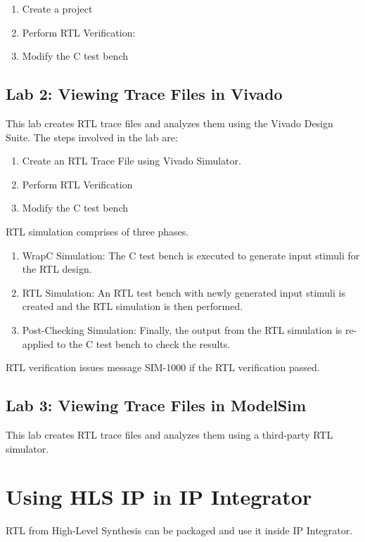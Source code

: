 \begin{enumerate}[label=Step \arabic*:]
    \item Create a project    
    \item Perform RTL Verification:\\ 
    \item Modify the C test bench
\end{enumerate}

\subsection{Lab 2: Viewing Trace Files in Vivado}
This lab creates RTL trace files and analyzes them using the Vivado Design Suite. The steps involved in the lab are:
\begin{enumerate}[label=Step \arabic*:]
    \item Create an RTL Trace File using Vivado Simulator.
    \item Perform RTL Verification
    \item Modify the C test bench
\end{enumerate}

RTL simulation comprises of three phases.
\begin{enumerate}[label=Phase \arabic*:]
    \item WrapC Simulation: The C test bench is executed to generate input stimuli for the RTL design.
    \item RTL Simulation: An RTL test bench with newly generated input stimuli is created and the RTL simulation is then performed.
    \item Post-Checking Simulation: Finally, the output from the RTL simulation is re-applied to the C test bench to check the results. 
\end{enumerate}
RTL verification issues message SIM-1000 if the RTL verification passed.

\subsection{Lab 3: Viewing Trace Files in ModelSim}
This lab creates RTL trace files and analyzes them using a third-party RTL simulator. 

\section{Using HLS IP in IP Integrator}
RTL from High-Level Synthesis can be packaged and use it inside IP Integrator.

